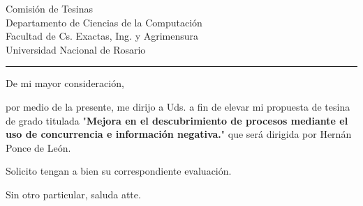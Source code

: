 \documentclass{letter}
\date{Rosario, \today}
\begin{document}
\begin{letter}{Comisi\'on de Tesinas \\ Departamento de Ciencias de la Computaci\'on \\ Facultad de Cs. Exactas, Ing. y Agrimensura \\ Universidad Nacional de Rosario \\ \rule{7.5cm}{0.1pt}}

\opening{De mi mayor consideraci\'on, }
\setlength{\parindent}{4em}
\setlength{\parskip}{1em}
por medio de la presente, me dirijo a Uds. a fin de elevar mi propuesta de tesina de grado titulada "\textbf{Mejora en el descubrimiento de procesos mediante el uso de concurrencia e informaci\'on negativa.}" que ser\'a dirigida por Hern\'an Ponce de Le\'on. 

Solicito tengan a bien su correspondiente evaluaci\'on.

\closing{Sin otro particular, saluda atte.}
\end{letter}
\end{document}
